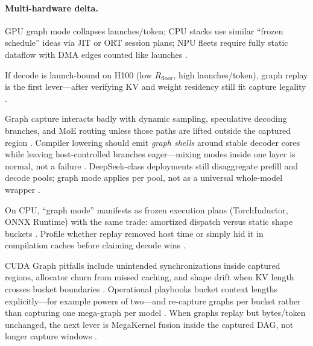 \paragraph{Multi-hardware delta.} GPU graph mode collapses launches/token; CPU stacks use similar ``frozen schedule'' ideas via JIT or ORT session plans; NPU fleets require fully static dataflow with DMA edges counted like launches \citep{dlbook,amd2024xdna,chen2020compilerbasedhardw}.

\begin{example}
If decode is launch-bound on H100 (low $R_{\mathrm{floor}}$, high launches/token), graph replay is the first lever---after verifying KV and weight residency still fit capture legality \citep{memoryfloor2026,nvidia2024cudagraphs,taxbreak2026}.
\end{example}

Graph capture interacts badly with dynamic sampling, speculative decoding branches, and MoE routing unless those paths are lifted outside the captured region \citep{taxbreak2026,liu2024deepseekv3,kwon2023vllm}. Compiler lowering should emit \emph{graph shells} around stable decoder cores while leaving host-controlled branches eager---mixing modes inside one layer is normal, not a failure \citep{yirage2026,chen2020compilerbasedhardw,nvidia2024cudagraphs}. DeepSeek-class deployments still disaggregate prefill and decode pools; graph mode applies per pool, not as a universal whole-model wrapper \citep{patel2025llminference,liu2024deepseekv3}.

On CPU, ``graph mode'' manifests as frozen execution plans (TorchInductor, ONNX Runtime) with the same trade: amortized dispatch versus static shape buckets \citep{dlbook,chen2020compilerbasedhardw}. Profile whether replay removed host time or simply hid it in compilation caches before claiming decode wins \citep{memoryfloor2026,patel2025llminference,taxbreak2026}.

CUDA Graph pitfalls include unintended synchronizations inside captured regions, allocator churn from missed caching, and shape drift when KV length crosses bucket boundaries \citep{nvidia2024cudagraphs,kwon2023vllm,memoryfloor2026}. Operational playbooks bucket context lengths explicitly---for example powers of two---and re-capture graphs per bucket rather than capturing one mega-graph per model \citep{patel2025llminference,yirage2026,chen2020compilerbasedhardw}. When graphs replay but bytes/token unchanged, the next lever is MegaKernel fusion inside the captured DAG, not longer capture windows \citep{taxbreak2026,dao2022flashattention,semianalysis2024tma,amd2024xdna}.

